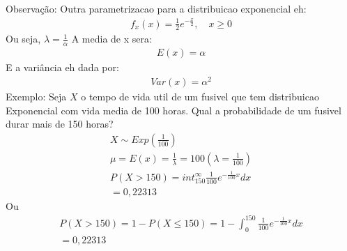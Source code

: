 \documentclass[11pt,a4paper]{book}
\begin{document}
\begin{description}
\begin{enumerate}
        Observação: Outra parametrizacao para a distribuicao exponencial eh:
        \begin{align*}
          f_{x} (x)= \frac{1}{2}e^{-\frac{x}{2}}, \quad x\ge 0
        \end{align*}
        Ou seja, $\lambda= \frac{1}{\alpha}$
        A media de x sera:
        \begin{align*}
          E(x)  = \alpha
        \end{align*}
        E a variância eh dada por:
        \begin{align*}
          Var(x) = \alpha^2
        \end{align*}
        Exemplo: Seja $X$ o tempo de vida util de um fusivel que tem distribuicao Exponencial
        com vida media de 100 horas. Qual a probabilidade de um fusivel durar mais de 150
        horas?
        \begin{align*}
          X \sim  Exp(\frac{1}{100}) \\
          \mu = E(x)= \frac{1}{\lambda}=100 \left( \lambda= \frac{1}{100} \right)\\
          P(X> 150)= int_{150}^{\infty} \frac{1}{100} e^{- \frac{1}{100} x} dx \\
          =0,22313
        \end{align*}
        Ou 
        \begin{align*}
          P(X>150) = 1- P(X \le 150)= 1- \int_{0}^{150} \frac{1}{100} e^{- \frac{1}{100}x}dx \\
          = 0,22313
        \end{align*}
      \end{enumerate}
\end{description}
\end{document}
